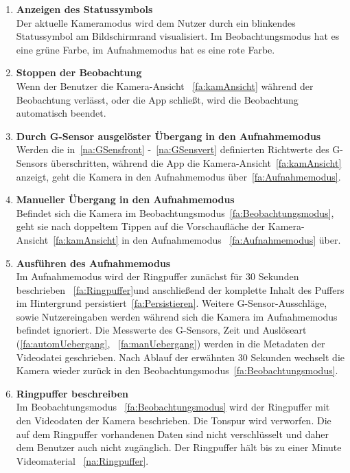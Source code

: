 \begin{enumerate}
\item \label{fa:Statussymbol}\textbf{Anzeigen des Statussymbols} \hfill \\
Der aktuelle Kameramodus wird dem Nutzer durch ein blinkendes Statussymbol am Bildschirmrand visualisiert. Im Beobachtungsmodus hat es eine grüne Farbe, im Aufnahmemodus hat es eine rote Farbe.

\item \textbf{Stoppen der Beobachtung} \hfill \\
Wenn der Benutzer die Kamera-Ansicht ~\eqref{fa:kamAnsicht} während der Beobachtung verlässt, oder die \gls{App} schließt, wird die Beobachtung automatisch beendet.

\item \label{fa:automUebergang}\textbf{Durch \gls{G-Sensor} ausgelöster Übergang in den Aufnahmemodus} \hfill \\
Werden die in~\eqref{na:GSensfront} -~\eqref{na:GSensvert} definierten Richtwerte des G-Sensors überschritten, während die \gls{App} die Kamera-Ansicht~\eqref{fa:kamAnsicht} anzeigt, geht die Kamera in den Aufnahmemodus über~\eqref{fa:Aufnahmemodus}. 

\item \label{fa:manUebergang}\textbf{Manueller Übergang in den Aufnahmemodus} \hfill \\
Befindet sich die Kamera im Beobachtungsmodus~\eqref{fa:Beobachtungsmodus}, geht sie nach doppeltem Tippen auf die Vorschaufläche der Kamera-Ansicht~\eqref{fa:kamAnsicht} in den Aufnahmemodus ~\eqref{fa:Aufnahmemodus} über.

\item \label{fa:Aufnahmemodus}\textbf{Ausführen des Aufnahmemodus} \hfill \\
Im Aufnahmemodus wird der \gls{Ringpuffer} zunächst für 30 Sekunden beschrieben ~\eqref{fa:Ringpuffer}und anschließend der komplette Inhalt des Puffers im Hintergrund persistiert~\eqref{fa:Persistieren}. Weitere \gls{G-Sensor}-Ausschläge, sowie Nutzereingaben werden während sich die Kamera im Aufnahmemodus befindet ignoriert. Die Messwerte des G-Sensors, Zeit und Auslöseart (\eqref{fa:automUebergang}, ~\eqref{fa:manUebergang}) werden in die \gls{Metadaten} der Videodatei geschrieben. Nach Ablauf der erwähnten 30 Sekunden wechselt die Kamera wieder zurück in den Beobachtungsmodus~\eqref{fa:Beobachtungsmodus}.

\item \label{fa:Ringpuffer}\textbf{\gls{Ringpuffer} beschreiben} \hfill \\
Im Beobachtungsmodus ~\eqref{fa:Beobachtungsmodus} wird der \gls{Ringpuffer} mit den Videodaten der Kamera beschrieben. Die Tonspur wird verworfen. Die auf dem Ringpuffer vorhandenen Daten sind nicht verschlüsselt und daher dem Benutzer auch nicht zugänglich. Der Ringpuffer hält bis zu einer Minute Videomaterial ~\eqref{na:Ringpuffer}.


\end{enumerate}
